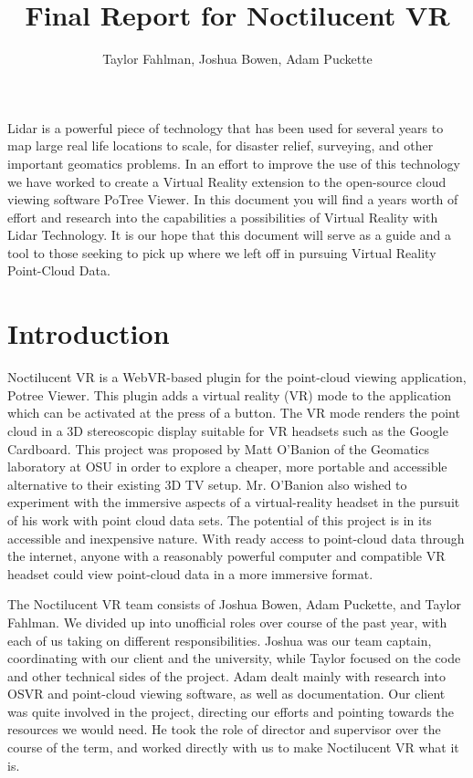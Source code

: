 \documentclass[draftclsnofoot,onecolumn]{IEEEtran}
\begin{document}
\title {Final Report for Noctilucent VR}
\author {Taylor Fahlman, Joshua Bowen, Adam Puckette}

\maketitle

\abstract
Lidar is a powerful piece of technology that has been used for several years to map large real life locations to scale, for disaster relief, surveying, and other important geomatics problems.
In an effort to improve the use of this technology we have worked to create a Virtual Reality extension to the open-source cloud viewing software PoTree Viewer.
In this document you will find a years worth of effort and research into the capabilities a possibilities of Virtual Reality with Lidar Technology.
It is our hope that this document will serve as a guide and a tool to those seeking to pick up where we left off in pursuing Virtual Reality Point-Cloud Data.

\newpage
\section{Introduction}

Noctilucent VR is a WebVR-based plugin for the point-cloud viewing application, Potree Viewer. 
This plugin adds a virtual reality (VR) mode to the application which can be activated at the press of a button. 
The VR mode renders the point cloud in a 3D stereoscopic display suitable for VR headsets such as the Google Cardboard. 
This project was proposed by Matt O'Banion of the Geomatics laboratory at OSU in order to explore a cheaper, more portable and accessible alternative to their existing 3D TV setup. 
Mr. O'Banion also wished to experiment with the immersive aspects of a virtual-reality headset in the pursuit of his work with point cloud data sets. 
The potential of this project is in its accessible and inexpensive nature. 
With ready access to point-cloud data through the internet, anyone with a reasonably powerful computer and compatible VR headset could view point-cloud data in a more immersive format. 

The Noctilucent VR team consists of Joshua Bowen, Adam Puckette, and Taylor Fahlman. 
We divided up into unofficial roles over course of the past year, with each of us taking on different responsibilities. 
Joshua was our team captain, coordinating with our client and the university, while Taylor focused on the code and other technical sides of the project. 
Adam dealt mainly with research into OSVR and point-cloud viewing software, as well as documentation.
Our client was quite involved in the project, directing our efforts and pointing towards the resources we would need. 
He took the role of director and supervisor over the course of the term, and worked directly with us to make Noctilucent VR what it is.
\end{document}
